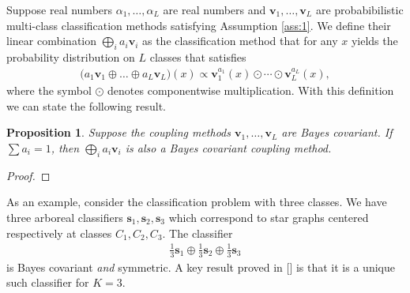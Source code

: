 \documentclass[twoside,11pt]{article}
\newtheorem{prop}{Proposition}
\begin{document}
Suppose real numbers $\alpha_1, \ldots,\alpha_L$ are real numbers and $\boldsymbol{v}_1, \ldots, \boldsymbol{v}_L$ are probabibilistic multi-class classification methods satisfying Assumption \ref{ass:1}. We define their linear combination $\bigoplus_i a_i \boldsymbol{v}_i$ as the classification method that for any $x$ yields the probability distribution on $L$ classes that satisfies
\begin{align*}
 	\bigl(a_1 \boldsymbol{v}_1 \oplus \ldots \oplus a_L \boldsymbol{v}_L\bigr)(x) \propto \boldsymbol{v}_1^{a_1}(x) \odot \cdots \odot \boldsymbol{v}_L^{a_L}(x),
\end{align*}
where the symbol $\odot$ denotes componentwise multiplication. With this definition we can state the following result.

\begin{prop}
Suppose the coupling methods $\boldsymbol{v}_1, \ldots, \boldsymbol{v}_L$ are Bayes covariant. If $\sum a_i = 1$, then $\bigoplus_i a_i \boldsymbol{v}_i$ is also a Bayes covariant coupling method.
\end{prop}

\begin{proof}
	
	
\end{proof}


% 

As an example, consider the classification problem with three classes. We have three arboreal classifiers $\boldsymbol{s}_1, \boldsymbol{s}_2, \boldsymbol{s}_3$ which correspond to star graphs centered respectively at classes $C_1, C_2, C_3$. The classifier 
\begin{align}
\frac13 \boldsymbol{s}_1 \oplus \frac13 \boldsymbol{s}_2 \oplus \frac 13 \boldsymbol{s}_3  \label{eq:bc1}
\end{align}
is Bayes covariant \emph{and} symmetric. A key result proved in [\cite{vsuch2016bayes}] is that it is a unique such classifier for $K=3$.
\end{document}
